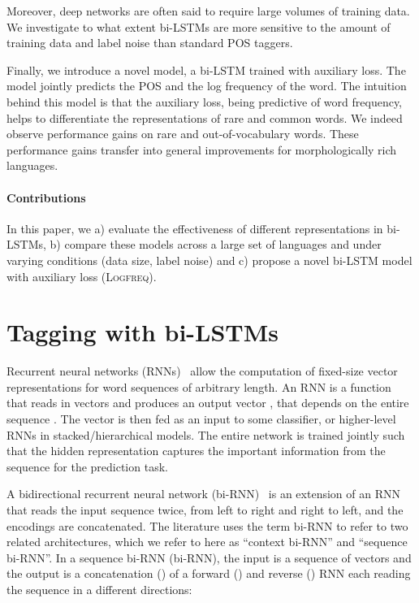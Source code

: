 \documentclass[11pt]{article}
\begin{document}
Moreover, deep networks are often said to require large volumes of training data. We investigate to what extent bi-LSTMs are more sensitive to the amount of training data and label noise than 
standard POS taggers.

Finally, we introduce a novel model, a bi-LSTM trained with auxiliary loss. The model jointly predicts the POS and the log frequency of 
the word. The intuition behind this model is that the auxiliary loss, being predictive of word frequency, helps to differentiate the representations of rare and common words.
We indeed observe performance gains on rare and out-of-vocabulary words. These performance gains transfer into general improvements for morphologically rich languages. 

\paragraph{Contributions} In this paper, we a) evaluate the effectiveness of different representations in bi-LSTMs, 
b) compare these models across a large set of languages and under varying conditions (data size, label noise) and
c) propose a novel bi-LSTM model with auxiliary loss (\textsc{Logfreq}). 


\section{Tagging with bi-LSTMs}

Recurrent neural networks (RNNs)~\cite{elman:1990} allow the computation of fixed-size vector representations for word sequences of arbitrary length.  
An RNN is a function that reads in  vectors  and produces an output vector , that depends on the entire sequence . 
The vector  is then fed as an input to some classifier, or higher-level RNNs in stacked/hierarchical models.
The entire network is trained jointly such that the hidden representation captures the important information from the sequence for the prediction task.

A bidirectional recurrent neural network (bi-RNN)~\cite{graves:schmidhuber:2005} is an extension of an RNN that reads the input sequence twice, 
from left to right and right to left, and the encodings are concatenated. 
The literature uses the term bi-RNN to refer to two related architectures, which we refer to here as ``context bi-RNN'' and ``sequence bi-RNN''.
In a sequence bi-RNN (bi-RNN), the input is a sequence of vectors  and the output is a concatenation () of a forward () and reverse () 
RNN each reading the sequence in a different directions:
\end{document}
